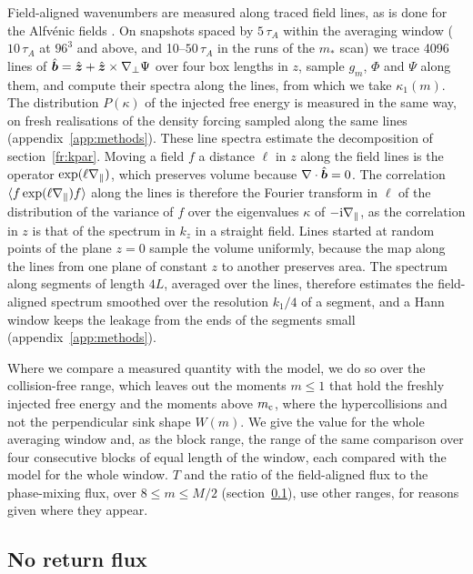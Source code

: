 Field-aligned wavenumbers are measured along traced field lines, as is done for the Alfv\'enic fields \citep{ChoVishniac2000,Meyrand2019}. On snapshots spaced by $5\,\tau_A$ within the averaging window ($10\,\tau_A$ at $96^3$ and above, and 10--$50\,\tau_A$ in the runs of the $m_*$ scan) we trace 4096 lines of $\hat{\boldsymbol b}=\hat{\boldsymbol z}+\hat{\boldsymbol z}\times\nabla_\perp\Psi$ over four box lengths in $z$, sample $g_m$, $\Phi$ and $\Psi$ along them, and compute their spectra along the lines, from which we take $\kappa_1(m)$. The distribution $P(\kappa)$ of the injected free energy is measured in the same way, on fresh realisations of the density forcing sampled along the same lines (appendix~\ref{app:methods}). These line spectra estimate the decomposition of section~\ref{fr:kpar}. Moving a field $f$ a distance $\ell$ in $z$ along the field lines is the operator $\exp(\ell\nabla_\parallel)$, which preserves volume because $\nabla\cdot\hat{\boldsymbol b}=0$. The correlation $\langle f\exp(\ell\nabla_\parallel)f\rangle$ along the lines is therefore the Fourier transform in $\ell$ of the distribution of the variance of $f$ over the eigenvalues $\kappa$ of $-\mathrm{i}\nabla_\parallel$, as the correlation in $z$ is that of the spectrum in $k_z$ in a straight field. Lines started at random points of the plane $z=0$ sample the volume uniformly, because the map along the lines from one plane of constant $z$ to another preserves area. The spectrum along segments of length $4L$, averaged over the lines, therefore estimates the field-aligned spectrum smoothed over the resolution $k_1/4$ of a segment, and a Hann window keeps the leakage from the ends of the segments small (appendix~\ref{app:methods}).

Where we compare a measured quantity with the model, we do so over the collision-free range, which leaves out the moments $m\le1$ that hold the freshly injected free energy and the moments above $m_{\rm c}$, where the hypercollisions and not the perpendicular sink shape $W(m)$. We give the value for the whole averaging window and, as the block range, the range of the same comparison over four consecutive blocks of equal length of the window, each compared with the model for the whole window. $T$ and the ratio of the field-aligned flux to the phase-mixing flux, over $8\le m\le M/2$ (section~\ref{sim:flux}), use other ranges, for reasons given where they appear.

\subsection{No return flux}\label{sim:flux}

